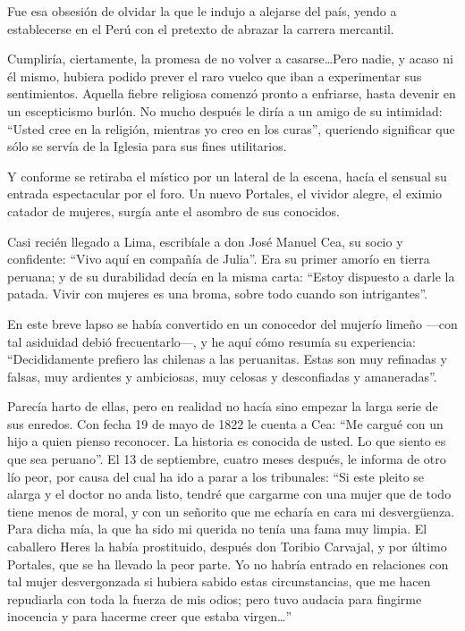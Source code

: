\documentclass[10pt,twoside,openright]{memoir}
\begin{document}
Fue esa obsesión de olvidar la que le indujo a alejarse del país, yendo
a establecerse en el Perú con el pretexto de abrazar la carrera
mercantil.

Cumpliría, ciertamente, la promesa
de no volver a casarse\ldots Pero
nadie, y acaso ni él mismo, hubiera podido prever el raro vuelco que
iban a experimentar sus sentimientos. Aquella fiebre religiosa comenzó
pronto a enfriarse, hasta devenir en
un escepticismo burlón. No mucho después le diría a un amigo de su
intimidad: ``Usted cree en la religión, mientras yo
creo en los curas'', queriendo
significar que sólo se servía de la Iglesia para sus fines utilitarios.

Y conforme se retiraba el místico por un lateral de la escena, hacía el
sensual su entrada espectacular por
el foro. Un nuevo Portales, el vividor alegre, el eximio catador de
mujeres, surgía ante el asombro de sus conocidos.

Casi recién llegado a Lima, escribíale a don José
Manuel Cea, su socio y confidente:
``Vivo aquí en compañía de Julia''. Era su primer amorío en tierra
peruana; y de su durabilidad decía en la misma carta: ``Estoy dispuesto a
darle la patada. Vivir con mujeres es una broma, sobre todo cuando son
intrigantes''.

En este breve lapso se había convertido en un conocedor del mujerío
limeño ---con tal asiduidad debió frecuentarlo---, y he aquí cómo
resumía su experiencia: ``Decididamente prefiero las chilenas a las
peruanitas. Estas son muy refinadas y falsas, muy ardientes y
ambiciosas, muy celosas y desconfiadas y
amaneradas''.

Parecía harto de ellas, pero en
realidad no hacía sino empezar la larga serie de sus enredos. Con fecha
 19 de mayo de 1822 le cuenta a Cea:
``Me cargué con un hijo a quien pienso reconocer. La historia es conocida
de usted. Lo que siento es que sea peruano''. El 13 de septiembre, cuatro
meses después, le informa de otro
lío peor, por causa del cual ha ido a parar a los tribunales: ``Si este
pleito se alarga y el doctor no anda listo, tendré que cargarme con una
mujer que de todo tiene menos de moral, y con un señorito que me echaría
en cara mi desvergüenza. Para dicha mía, la que ha sido mi querida no
tenía una fama muy limpia. El caballero Heres la había prostituido,
después don Toribio Carvajal, y por último Portales, que se ha llevado
la peor parte. Yo no habría entrado en relaciones con tal mujer
desvergonzada si hubiera sabido
estas circunstancias, que me hacen repudiarla con toda la fuerza de mis
odios; pero tuvo audacia para fingirme inocencia y para hacerme creer
que estaba virgen\ldots''
\end{document}
